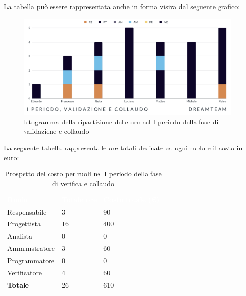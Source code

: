 La tabella può essere rappresentata anche in forma visiva dal seguente grafico:
\begin{figure}[H]
\centering
\includegraphics[scale=0.65]{Sezioni/SezioniPreventivo/grafici/Validazione_collaudo_I_periodo.png}
\caption{Istogramma della ripartizione delle ore nel I periodo della fase di validazione e collaudo}
\end{figure}

La seguente tabella rappresenta le ore totali dedicate ad ogni ruolo e il costo in euro:

\begin{table}[H]
\begin{center}
\renewcommand{\arraystretch}{1.5}
\begin{tabular}{ m{}<{\centering}  m{}<{\centering} m{}<{\centering}}
	\rowcolor{darkblue}
	\textcolor{white}{\textbf{Ruolo}}&\textcolor{white}{\textbf{Totale ore}}&\textcolor{white}{\textbf{Costo totale (\euro)}}\\ 

	Responsabile  & 3 & 90 \\	
	
	Progettista & 16 & 400 \\
	
	Analista & 0 & 0 \\

	Amministratore & 3 & 60 \\
	
	Programmatore & 0 & 0 \\
	
	Verificatore & 4 & 60 \\
	
	\textbf{Totale} & 26 & 610 \\
	
\end{tabular}
\caption{Prospetto del costo per ruoli nel I periodo della fase di verifica e collaudo}
\end{center}
\end{table}

